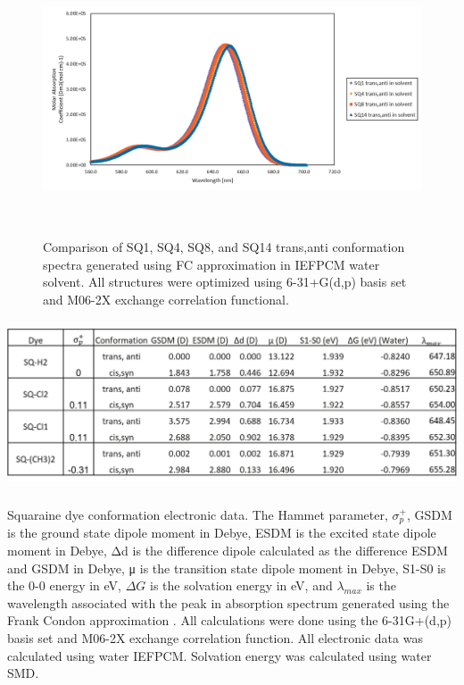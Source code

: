 \documentclass[journal=jacsat,manuscript=article]{achemso}
\begin{document}
\begin{figure}[h]
    \centering
    \includegraphics[width=15cm,height=8cm]{figures/sq1_4_8_14.png}
    \caption{Comparison of  SQ1, SQ4, SQ8, and SQ14 trans,anti conformation spectra generated using FC approximation in IEFPCM water solvent. All structures were optimized  using 6-31+G(d,p) basis set and M06-2X exchange correlation functional.}
    \label{tab:SQ1,4,8,14 absorption}
\end{figure}


\begin{table}[h]
    \centering
    \includegraphics[width=17cm,height=5cm]{figures/sq1_4_8_14-table.png}
    \caption{Squaraine dye conformation electronic data. The Hammet parameter, $\sigma_{p}^{+}$\cite{Hansch1991AParameters}, GSDM is the ground state dipole moment in Debye, ESDM is the excited state dipole moment in Debye, Δd is the difference dipole calculated as the difference ESDM and GSDM in Debye, μ is the transition state dipole moment in Debye, S1-S0 is the 0-0 energy in eV, $\Delta G$ is the solvation energy in eV, and $\lambda_{max}$ is the wavelength associated with the peak in absorption spectrum generated using the Frank Condon approximation . All calculations were done using the 6-31G+(d,p) basis set and M06-2X exchange correlation function. All electronic data was calculated using water IEFPCM. Solvation energy was calculated using water SMD.}
    \label{tab:SQ1,4,8,14 lambda data}
\end{table}
\end{document}
